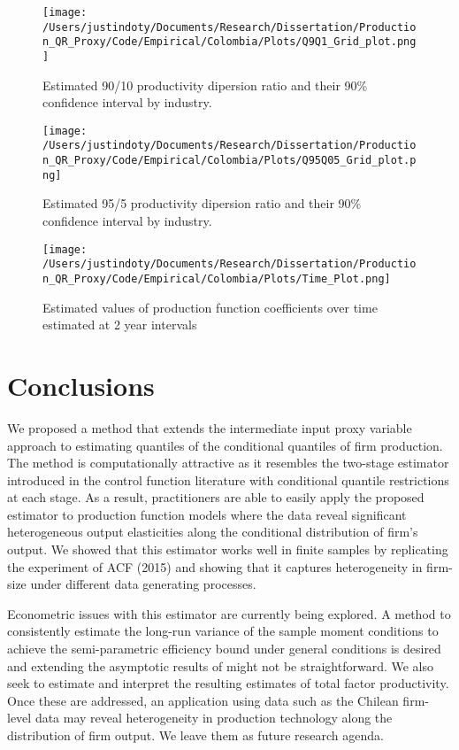 \documentclass[11pt]{article}
\begin{document}
\begin{figure}[H]
\centering
\texttt{[image: /Users/justindoty/Documents/Research/Dissertation/Production\_QR\_Proxy/Code/Empirical/Colombia/Plots/Q9Q1\_Grid\_plot.png]}
\caption{Estimated 90/10 productivity dipersion ratio and their 90\% confidence interval by industry.}
\end{figure}

\begin{figure}[H]
\centering
\texttt{[image: /Users/justindoty/Documents/Research/Dissertation/Production\_QR\_Proxy/Code/Empirical/Colombia/Plots/Q95Q05\_Grid\_plot.png]}
\caption{Estimated 95/5 productivity dipersion ratio and their 90\% confidence interval by industry.}
\end{figure}

\begin{figure}[H]
\centering
\texttt{[image: /Users/justindoty/Documents/Research/Dissertation/Production\_QR\_Proxy/Code/Empirical/Colombia/Plots/Time\_Plot.png]}
\caption{Estimated values of production function coefficients over time estimated at 2 year intervals}
\end{figure}

\section{Conclusions} \label{conclusion}

We proposed a method that extends the intermediate input proxy variable approach to estimating quantiles of the conditional quantiles of firm production. The method is computationally attractive as it resembles the two-stage estimator introduced in the control function literature with conditional quantile restrictions at each stage. As a result, practitioners are able to easily apply the proposed estimator to production function models where the data reveal significant heterogeneous output elasticities along the conditional distribution of firm's output. We showed that this estimator works well in finite samples by replicating the experiment of ACF (2015) and showing that it captures heterogeneity in firm-size under different data generating processes.  

Econometric issues with this estimator are currently being explored. A method to consistently estimate the long-run variance of the sample moment conditions to achieve the semi-parametric efficiency bound under general conditions is desired and extending the asymptotic results of \cite*{qgmm} might not be straightforward. We also seek to estimate and interpret the resulting estimates of total factor productivity. Once these are addressed, an application using data such as the Chilean firm-level data may reveal heterogeneity in production technology along the distribution of firm output. 
We leave them as future research agenda.
\end{document}
